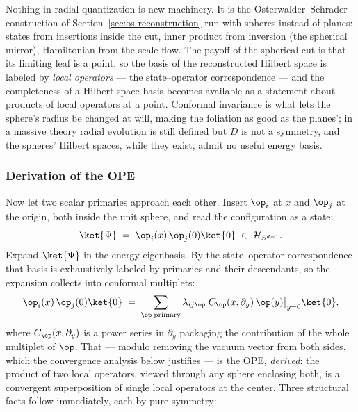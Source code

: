 \begin{iintuition}
\label{int:radial}
Nothing in radial quantization is new machinery. It is the
Osterwalder--Schrader construction of Section~\ref{sec:os-reconstruction} run
with spheres instead of planes: states from insertions inside the cut, inner
product from inversion (the spherical mirror), Hamiltonian from the scale
flow. The payoff of the spherical cut is that its limiting leaf is a point, so
the basis of the reconstructed Hilbert space is labeled by \emph{local
operators} --- the state--operator correspondence --- and the completeness of
a Hilbert-space basis becomes available as a statement about products of local
operators at a point. Conformal invariance is what lets the sphere's radius be
changed at will, making the foliation as good as the planes'; in a massive
theory radial evolution is still defined but $D$ is not a symmetry, and the
spheres' Hilbert spaces, while they exist, admit no useful energy basis.
\end{iintuition}

\subsubsection{Derivation of the OPE}
\label{sec:ope-derivation}

Now let two scalar primaries approach each other. Insert $\op_i$ at $x$ and
$\op_j$ at the origin, both inside the unit sphere, and read the
configuration as a state:
\begin{equation}
\ket{\Psi} \;=\; \op_i(x)\,\op_j(0)\ket{0} \;\in\; \mathcal{H}_{S^{d-1}}.
\end{equation}
Expand $\ket{\Psi}$ in the energy eigenbasis. By the state--operator
correspondence that basis is exhaustively labeled by primaries and their
descendants, so the expansion collects into conformal multiplets:
\begin{equation}
\op_i(x)\, \op_j(0)\ket{0}
\;=\; \sum_{\op \;\rm primary} \lambda_{ij\op}\;
C_{\op}(x, \partial_y)\, \op(y)\big|_{y=0}\ket{0},
\label{eq:ope-radial}
\end{equation}
where $C_\op(x,\partial_y)$ is a power series in $\partial_y$ packaging the
contribution of the whole multiplet of $\op$. That --- modulo removing the
vacuum vector from both sides, which the convergence analysis below justifies
--- is the OPE, \emph{derived}: the product of two local operators, viewed
through any sphere enclosing both, is a convergent superposition of single
local operators at the center. Three structural facts follow immediately, each
by pure symmetry:

